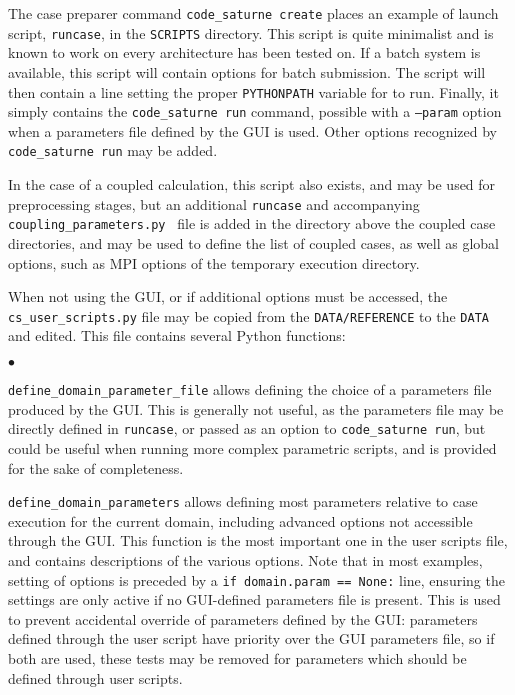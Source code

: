 {{{{The case preparer command \texttt{code\_saturne~create} places an example of launch script,
\texttt{runcase}, in the \texttt{SCRIPTS} directory. This script is quite minimalist and is known to work on every architecture \CS has been tested on.
If a batch system is available, this script will contain options
for batch submission.
The script will then contain a line setting the proper \texttt{PYTHONPATH}
variable for \CS to run.
Finally, it simply contains the \texttt{code\_saturne run}  command,
possible with a \texttt{--param} option when a parameters file
defined by the GUI is used. Other options recognized by
\texttt{code\_saturne run} may be added.

In the case of a coupled calculation, this script also exists, and
may be used for preprocessing stages, but an additional
\texttt{runcase} and accompanying \texttt{coupling\_parameters.py } file
is added in the directory above the coupled case
directories, and may be used to define the list of coupled cases,
as well as global options, such as MPI options of the temporary
execution directory.

When not using the GUI, or if additional options must be accessed,
the \texttt{cs\_user\_scripts.py} file may be copied from
the \texttt{DATA/REFERENCE} to the \texttt{DATA} and edited.
This file contains several Python functions:

\begin{list}{$\bullet$}{}

\item \texttt{define\_domain\_parameter\_file} allows defining
 the choice of a parameters file produced by the GUI. This is
 generally not useful, as the parameters file may be directly
 defined in \texttt{runcase}, or passed
 as an option to \texttt{code\_saturne run}, but could be useful
 when running more complex parametric scripts, and is provided for
 the sake of completeness.
\item \texttt{define\_domain\_parameters} allows defining
 most parameters relative to case execution for the current
 domain, including advanced options not accessible
 through the GUI. This function is the most important one in the user
 scripts file, and contains descriptions of the various options.
 Note that in most examples, setting of options is preceded by
 a \texttt{if domain.param == None:} line, ensuring the settings
 are only active if no GUI-defined parameters file is present.
 This is used to prevent accidental override of parameters defined
 by the GUI: parameters defined through the user script have priority
 over the GUI parameters file, so if both are used, these tests
 may be removed for parameters which should be defined through
 user scripts.
\end{list}

}}}}
